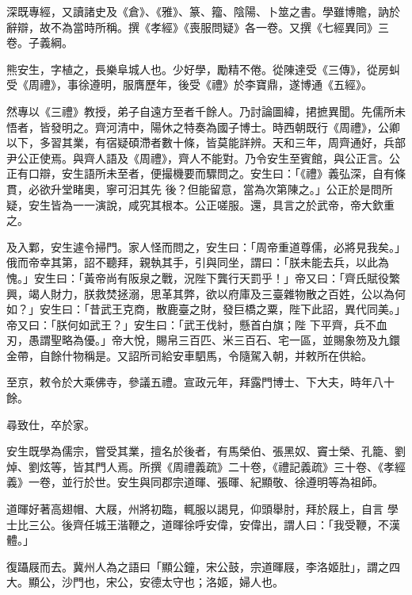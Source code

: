 \begin{pinyinscope}
 深既專經，又讀諸史及《倉》、《雅》、篆、籀、陰陽、卜筮之書。學雖博贍，訥於辭辯，故不為當時所稱。撰《孝經》《喪服問疑》各一卷。又撰《七經異同》三卷。子義綱。



 熊安生，字植之，長樂阜城人也。少好學，勵精不倦。從陳達受《三傳》，從房虯受《周禮》，事徐遵明，服膺歷年，後受《禮》於李寶鼎，遂博通《五經》。



 然專以《三禮》教授，弟子自遠方至者千餘人。乃討論圖緯，捃摭異聞。先儒所未悟者，皆發明之。齊河清中，陽休之特奏為國子博士。時西朝既行《周禮》，公卿以下，多習其業，有宿疑碩滯者數十條，皆莫能詳辨。天和三年，周齊通好，兵部尹公正使焉。與齊人語及《周禮》，齊人不能對。乃令安生至賓館，與公正言。公正有口辯，安生語所未至者，便撮機要而驟問之。安生曰：「《禮》義弘深，自有條貫，必欲升堂睹奧，寧可汨其先
 後？但能留意，當為次第陳之。」公正於是問所疑，安生皆為一一演說，咸究其根本。公正嗟服。還，具言之於武帝，帝大欽重之。



 及入鄴，安生遽令掃門。家人怪而問之，安生曰：「周帝重道尊儒，必將見我矣。」俄而帝幸其第，詔不聽拜，親執其手，引與同坐，謂曰：「朕未能去兵，以此為愧。」安生曰：「黃帝尚有阪泉之戰，況陛下龔行天罰乎！」帝又曰：「齊氏賦役繁興，竭人財力，朕救焚拯溺，思革其弊，欲以府庫及三臺雜物散之百姓，公以為何如？」安生曰：「昔武王克商，散鹿臺之財，發巨橋之粟，陛下此詔，異代同美。」帝又曰：「朕何如武王？」安生曰：「武王伐紂，懸首白旗；陛
 下平齊，兵不血刃，愚謂聖略為優。」帝大悅，賜帛三百匹、米三百石、宅一區，並賜象笏及九鐶金帶，自餘什物稱是。又詔所司給安車駟馬，令隨駕入朝，并敕所在供給。



 至京，敕令於大乘佛寺，參議五禮。宣政元年，拜露門博士、下大夫，時年八十餘。



 尋致仕，卒於家。



 安生既學為儒宗，嘗受其業，擅名於後者，有馬榮伯、張黑奴、竇士榮、孔籠、劉焯、劉炫等，皆其門人焉。所撰《周禮義疏》二十卷，《禮記義疏》三十卷、《孝經義》一卷，並行於世。安生與同郡宗道暉、張暉、紀顯敬、徐遵明等為祖師。



 道暉好著高翅帽、大屐，州將初臨，輒服以謁見，仰頭舉肘，拜於屐上，自言
 學士比三公。後齊任城王湝鞭之，道暉徐呼安偉，安偉出，謂人曰：「我受鞭，不漢體。」



 復躡屐而去。冀州人為之語曰「顯公鐘，宋公鼓，宗道暉屐，李洛姬肚」，謂之四大。顯公，沙門也，宋公，安德太守也；洛姬，婦人也。




\end{pinyinscope}
